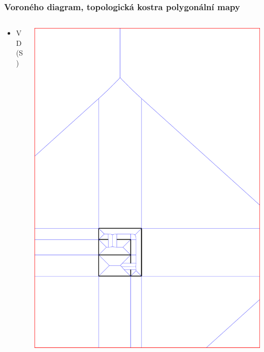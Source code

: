 \documentclass[notes=false,pdftex]{beamer}
\begin{document}
\begin{frame}
	\frametitle{Voroného diagram, topologická kostra polygonální mapy}

	\begin{columns}[T]
		\begin{column}{0.5\textwidth}
			\begin{itemize}
				\item VD(S)
			\end{itemize}
		\end{column}
		\begin{column}{0.5\textwidth}
			\includegraphics[width=1\textwidth,clip=true,trim=147pt 165pt 289pt 502pt]{images/vd_02.pdf} 
		\end{column}
	\end{columns}
\end{frame}
\end{document}
